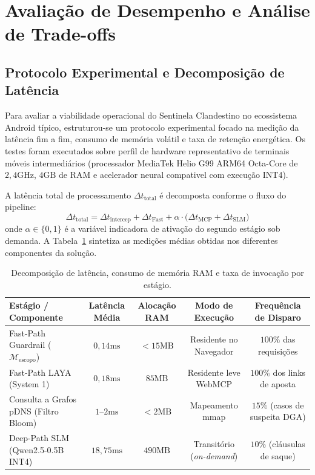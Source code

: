 \section{Avalia\c{c}\~{a}o de Desempenho e An\'{a}lise de Trade-offs}
\label{sec:avaliacao}

\subsection{Protocolo Experimental e Decomposi\c{c}\~{a}o de Lat\^{e}ncia}

Para avaliar a viabilidade operacional do Sentinela Clandestino no ecossistema Android t\'{i}pico, estruturou-se um protocolo experimental focado na medi\c{c}\~{a}o da lat\^{e}ncia fim a fim, consumo de mem\'{o}ria vol\'{a}til e taxa de reten\c{c}\~{a}o energ\'{e}tica. Os testes foram executados sobre perfil de hardware representativo de terminais m\'{o}veis intermedi\'{a}rios (processador MediaTek Helio G99 ARM64 Octa-Core de $2{,}4\text{GHz}$, $4\text{GB}$ de RAM e acelerador neural compativel com execu\c{c}\~{a}o INT4).

A lat\^{e}ncia total de processamento $\Delta t_{\text{total}}$ \'{e} decomposta conforme o fluxo do pipeline:
\begin{equation}
    \Delta t_{\text{total}} = \Delta t_{\text{intercep}} + \Delta t_{\text{Fast}} + \alpha \cdot \big(\Delta t_{\text{MCP}} + \Delta t_{\text{SLM}}\big)
\end{equation}
onde $\alpha \in \{0, 1\}$ \'{e} a vari\'{a}vel indicadora de ativa\c{c}\~{a}o do segundo est\'{a}gio sob demanda. A Tabela~\ref{tab:latencia_recursos} sintetiza as medi\c{c}\~{o}es m\'{e}dias obtidas nos diferentes componentes da solu\c{c}\~{a}o.

\begin{table}[!htbp]
\centering
\caption{Decomposi\c{c}\~{a}o de lat\^{e}ncia, consumo de mem\'{o}ria RAM e taxa de invoca\c{c}\~{a}o por est\'{a}gio.}
\label{tab:latencia_recursos}
\setlength{\tabcolsep}{6pt}
\scriptsize
\begin{tabular}{lcccc}
\toprule
\textbf{Est\'{a}gio / Componente} & \textbf{Lat\^{e}ncia M\'{e}dia} & \textbf{Aloca\c{c}\~{a}o RAM} & \textbf{Modo de Execu\c{c}\~{a}o} & \textbf{Frequ\^{e}ncia de Disparo} \\
\midrule
Fast-Path Guardrail ($\mathcal{M}_{\text{escopo}}$) & $0{,}14\text{ms}$ & $< 15\text{MB}$ & Residente no Navegador & $100\%$ das requisi\c{c}\~{o}es \\
Fast-Path LAYA (System 1) & $0{,}18\text{ms}$ & $85\text{MB}$ & Residente leve WebMCP & $100\%$ dos links de aposta \\
Consulta a Grafos pDNS (Filtro Bloom) & $1\text{--}2\text{ms}$ & $< 2\text{MB}$ & Mapeamento mmap & $15\%$ (casos de suspeita DGA) \\
Deep-Path SLM (Qwen2.5-0.5B INT4) & $18{,}75\text{ms}$ & $490\text{MB}$ & Transit\'{o}rio (\textit{on-demand}) & $10\%$ (cl\'{a}usulas de saque) \\
\bottomrule
\end{tabular}
\end{table}

